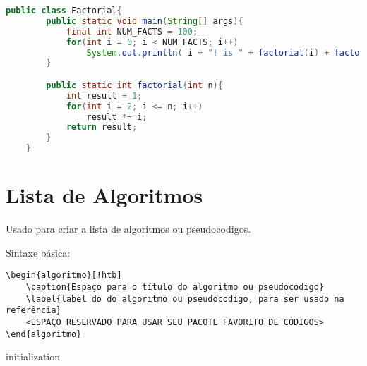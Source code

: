 \begin{codigo}
  \caption{Codigo Java}
  \begin{lstlisting}[language = Java]
    public class Factorial{
        public static void main(String[] args){   
            final int NUM_FACTS = 100;
            for(int i = 0; i < NUM_FACTS; i++)
                System.out.println( i + "! is " + factorial(i) + factorial(i) factorial(i) factorial(i));
        }

        public static int factorial(int n){
            int result = 1;
            for(int i = 2; i <= n; i++)
                result *= i;
            return result;
        }
    }
\end{lstlisting}
\end{codigo}



\section{Lista de Algoritmos}

Usado para criar a lista de algoritmos ou pseudocodigos.

Sintaxe básica:
\begin{verbatim}
\begin{algoritmo}[!htb]
    \caption{Espaço para o título do algoritmo ou pseudocodigo}
    \label{label do do algoritmo ou pseudocodigo, para ser usado na referência}  
    <ESPAÇO RESERVADO PARA USAR SEU PACOTE FAVORITO DE CÓDIGOS>
\end{algoritmo}
\end{verbatim}


\begin{algoritmo}[htb]
	\caption{Algoritmo exemplo}
	\label{alg1}
	\begin{algorithm}[H]
 	initialization\;
	\end{algorithm}
\end{algoritmo}
